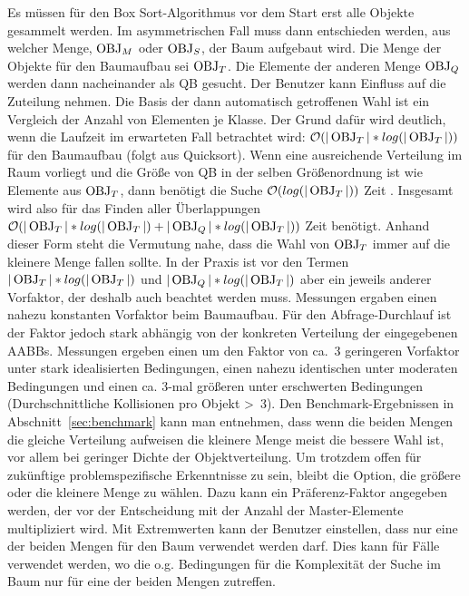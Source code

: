 Es müssen für den Box Sort-Algorithmus vor dem Start erst alle Objekte gesammelt werden. Im asymmetrischen Fall muss dann entschieden werden, aus welcher Menge, $\operatorname{OBJ}_M$ oder $\operatorname{OBJ}_S$, der Baum aufgebaut wird. Die Menge der Objekte für den Baumaufbau sei $\operatorname{OBJ}_T$. Die Elemente der anderen Menge $\operatorname{OBJ}_Q$ werden dann nacheinander als QB gesucht. Der Benutzer kann Einfluss auf die Zuteilung nehmen. Die Basis der dann automatisch getroffenen Wahl ist ein Vergleich der Anzahl von Elementen je Klasse. Der Grund dafür wird deutlich, wenn die Laufzeit im erwarteten Fall betrachtet wird: $\mathcal{O}(|\operatorname{OBJ}_T|*log(|\operatorname{OBJ}_T|))$ für den Baumaufbau (folgt aus Quicksort). Wenn eine ausreichende Verteilung im Raum vorliegt und die Größe von QB in der selben Größenordnung ist wie Elemente aus $\operatorname{OBJ}_T$, dann benötigt die Suche $\mathcal{O}(log(|\operatorname{OBJ}_T|))$ Zeit \cite[Abstract]{houthuys1987box}. Insgesamt wird also für das Finden aller Überlappungen $\mathcal{O}(|\operatorname{OBJ}_T|*log(|\operatorname{OBJ}_T|)+|\operatorname{OBJ}_Q|*log(|\operatorname{OBJ}_T|))$ Zeit benötigt. Anhand dieser Form steht die Vermutung nahe, dass die Wahl von $\operatorname{OBJ}_T$ immer auf die kleinere Menge fallen sollte. In der Praxis ist vor den Termen $|\operatorname{OBJ}_T|*log(|\operatorname{OBJ}_T|)$ und $|\operatorname{OBJ}_Q|*log(|\operatorname{OBJ}_T|)$ aber ein jeweils anderer Vorfaktor, der deshalb auch beachtet werden muss. Messungen ergaben einen nahezu konstanten Vorfaktor beim Baumaufbau. Für den Abfrage-Durchlauf  ist der Faktor jedoch stark abhängig von der konkreten Verteilung der eingegebenen AABBs. Messungen ergeben einen um den Faktor von ca.~3 geringeren Vorfaktor unter stark idealisierten Bedingungen, einen nahezu identischen unter moderaten Bedingungen und einen ca. 3-mal größeren unter erschwerten Bedingungen (Durchschnittliche Kollisionen pro Objekt \textgreater ~3). Den Benchmark-Ergebnissen in Abschnitt~\ref{sec:benchmark} kann man entnehmen, dass wenn die beiden Mengen die gleiche Verteilung aufweisen die kleinere Menge meist die bessere Wahl ist, vor allem bei geringer Dichte der Objektverteilung. Um trotzdem offen für zukünftige problemspezifische Erkenntnisse zu sein, bleibt die Option, die größere oder die kleinere Menge zu wählen. Dazu kann ein Präferenz-Faktor angegeben werden, der vor der Entscheidung mit der Anzahl der Master-Elemente multipliziert wird. Mit Extremwerten kann der Benutzer einstellen, dass nur eine der beiden Mengen für den Baum verwendet werden darf. Dies kann für Fälle verwendet werden, wo die o.g. Bedingungen für die Komplexität der Suche im Baum nur für eine der beiden Mengen zutreffen.\\
 
